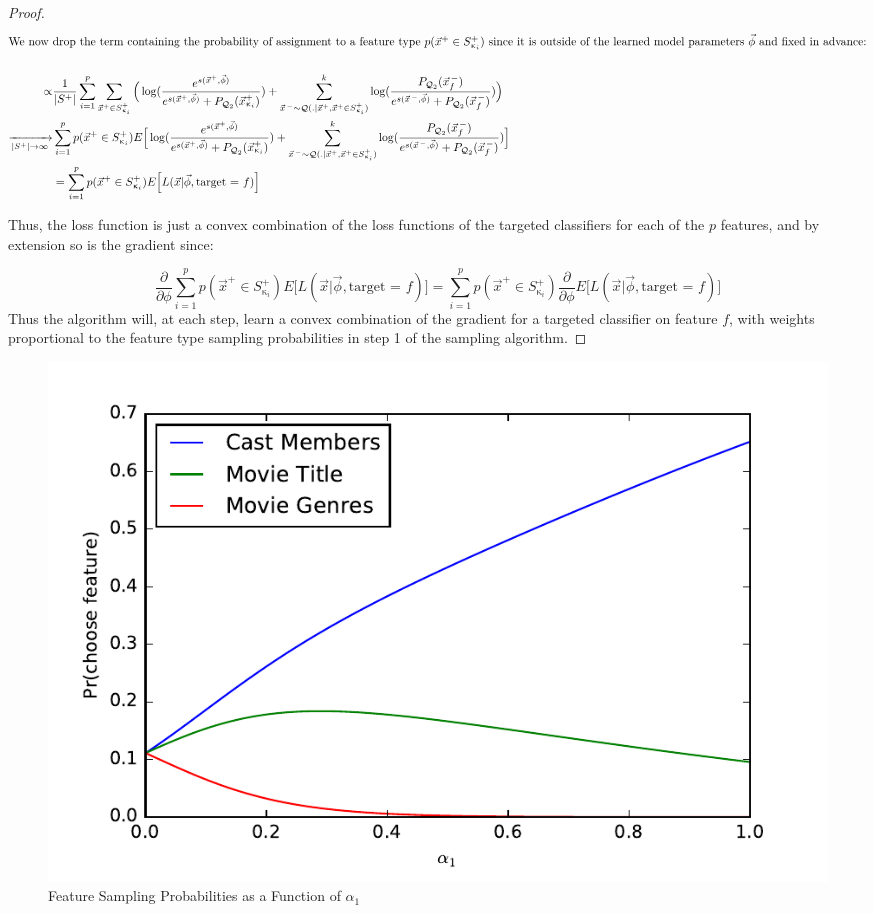 \documentclass{article} %
\newcommand{\vect}[1]{\vec{#1}}
\DeclareMathOperator{\q}{{\mathcal{Q}}}
\begin{document}
\begin{proof}
\begin{align*}
\intertext{We now drop the term containing the probability of assignment to a feature type $p(\vect{x}^+ \in S^+_{\upkappa_i})$ since it is outside of the learned model parameters $\vec{\phi}$ and fixed in advance:}\\
    \propto & \frac{1}{|S^+|} \sum_{i=1}^p \sum_{\vect{x}^+ \in S^+_{\upkappa_i}} \Big( \log(\frac{e^{s(\vect{x}^+,\vec{\phi}) }}{e^{s(\vect{x}^+,\vec{\phi}) } + P_{\q_2}(\vect{x}^+_{\upkappa_i}) }) + \sum_{\vect{x}^{\,-} \sim \q(.|\vect{x}^+,\vect{x}^+ \in S^+_{\upkappa_i})}^k \log(\frac{ P_{\q_2}(\vect{x}^{\,-}_{f})}{e^{s(\vect{x}^{\,-},\vec{\phi}) } + P_{\q_2}(\vect{x}^{\,-}_{f})}) \Big) \\
    \xrightarrow[|S^+|\rightarrow \infty]{ }  & \sum_{i=1}^p p(\vect{x}^+ \in S^+_{\upkappa_i}) E\Big[ \log(\frac{e^{s(\vect{x}^+,\vec{\phi}) }}{e^{s(\vect{x}^+,\vec{\phi}) } + P_{\q_2}(\vect{x}^+_{\upkappa_i}) }) + \sum_{\vect{x}^{\,-} \sim \q(.|\vect{x}^+,\vect{x}^+ \in S^+_{\upkappa_i})}^k \log(\frac{ P_{\q_2}(\vect{x}^{\,-}_{f})}{e^{s(\vect{x}^{\,-},\vec{\phi}) } + P_{\q_2}(\vect{x}^{\,-}_{f})}) \Big] \\
   & = \sum_{i=1}^p p(\vect{x}^+ \in S^+_{\upkappa_i}) E\Big[ L(\vec{x} |\vec{\phi}, \text{target = $f$}) \Big]
\end{align*}

Thus, the loss function is just a convex combination  of the loss functions of the targeted classifiers for each of the $p$ features, and by extension so is the gradient since:

\[\frac{\partial }{\partial \phi}\sum_{i=1}^p p(\vect{x}^+ \in S^+_{\upkappa_i}) E\Big[ L(\vec{x} |\vec{\phi}, \text{target = $f$}) \Big] =
 \sum_{i=1}^p p(\vect{x}^+ \in S^+_{\upkappa_i}) \frac{\partial }{\partial \phi}E\Big[ L(\vec{x} |\vec{\phi}, \text{target = $f$}) \Big]\]
 Thus the algorithm will, at each step, learn a convex combination of the gradient for a targeted classifier on feature $f$, with weights proportional to the feature type sampling probabilities in step 1 of the sampling algorithm.
\end{proof}

\begin{figure}[h!]
\centering
\includegraphics{../paper/output/samplingprobs.pdf}
\caption{Feature Sampling Probabilities as a Function of $\alpha_1$}
\end{figure}
\end{document}
